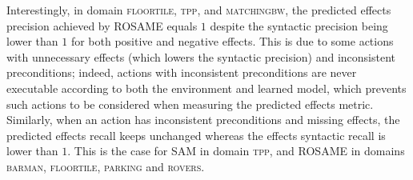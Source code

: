 \documentclass[letterpaper]{article} %
\newcommand{\sam}{\ac{SAM}\xspace}
\newcommand{\nolam}{NOLAM\xspace}
\newcommand{\offlam}{OffLAM\xspace}
\newcommand{\rosame}{ROSAME\xspace}
\newcommand{\commentout}[1]{ }
\newif\ifaddcomments
\newcommand{\roni}[1]{\ifaddcomments{\textcolor{red}{[Roni: #1]}}\fi}
\begin{document}
%
%
%
%
%
%
Interestingly, in domain \textsc{floortile, tpp}, and \textsc{matchingbw}, the predicted effects precision achieved by \rosame equals $1$ despite the syntactic precision being lower than $1$ for both positive and negative effects. This is due to some actions with unnecessary effects (which lowers the syntactic precision) and inconsistent preconditions; indeed, actions with inconsistent preconditions are never executable according to both the environment and learned model, which prevents such actions to be considered when measuring the predicted effects metric.
Similarly, when an action has inconsistent preconditions and missing effects, the predicted effects recall keeps unchanged whereas the effects syntactic recall is lower than $1$. This is the case for \sam in domain \textsc{tpp}, and \rosame in domains \textsc{barman, floortile, parking} and \textsc{rovers}. 
\commentout{
Furthermore, in \textsc{rovers}, the inconsistent effects in the reference model lower the effects syntactic recall for \offlam, \sam, and \nolam, but do not affect the predicted effects metric since such effects are static preconditions in the environment model.
\roni{I am not sure what do you mean by inconsistent effects. Can you explain?}}
%
\end{document}
